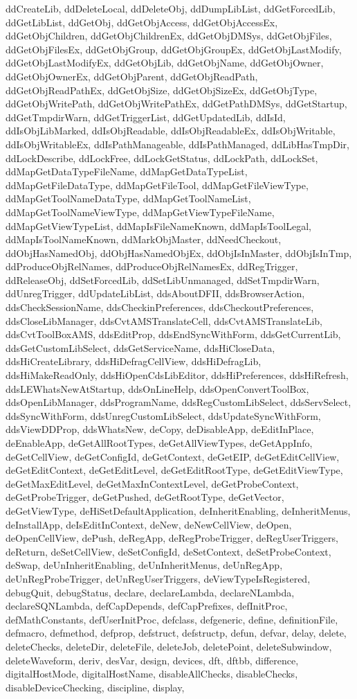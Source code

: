 {{ddCreateLib, ddDeleteLocal, ddDeleteObj, ddDumpLibList, ddGetForcedLib, ddGetLibList, ddGetObj, ddGetObjAccess, ddGetObjAccessEx, ddGetObjChildren, ddGetObjChildrenEx, ddGetObjDMSys, ddGetObjFiles, ddGetObjFilesEx, ddGetObjGroup, ddGetObjGroupEx, ddGetObjLastModify, ddGetObjLastModifyEx, ddGetObjLib, ddGetObjName, ddGetObjOwner, ddGetObjOwnerEx, ddGetObjParent, ddGetObjReadPath, ddGetObjReadPathEx, ddGetObjSize, ddGetObjSizeEx, ddGetObjType, ddGetObjWritePath, ddGetObjWritePathEx, ddGetPathDMSys, ddGetStartup, ddGetTmpdirWarn, ddGetTriggerList, ddGetUpdatedLib, ddIsId, ddIsObjLibMarked, ddIsObjReadable, ddIsObjReadableEx, ddIsObjWritable, ddIsObjWritableEx, ddIsPathManageable, ddIsPathManaged, ddLibHasTmpDir, ddLockDescribe, ddLockFree, ddLockGetStatus, ddLockPath, ddLockSet, ddMapGetDataTypeFileName, ddMapGetDataTypeList, ddMapGetFileDataType, ddMapGetFileTool, ddMapGetFileViewType, ddMapGetToolNameDataType, ddMapGetToolNameList, ddMapGetToolNameViewType, ddMapGetViewTypeFileName, ddMapGetViewTypeList, ddMapIsFileNameKnown, ddMapIsToolLegal, ddMapIsToolNameKnown, ddMarkObjMaster, ddNeedCheckout, ddObjHasNamedObj, ddObjHasNamedObjEx, ddObjIsInMaster, ddObjIsInTmp, ddProduceObjRelNames, ddProduceObjRelNamesEx, ddRegTrigger, ddReleaseObj, ddSetForcedLib, ddSetLibUnmanaged, ddSetTmpdirWarn, ddUnregTrigger, ddUpdateLibList, ddsAboutDFII, ddsBrowserAction, ddsCheckSessionName, ddsCheckinPreferences, ddsCheckoutPreferences, ddsCloseLibManager, ddsCvtAMSTranslateCell, ddsCvtAMSTranslateLib, ddsCvtToolBoxAMS, ddsEditProp, ddsEndSyncWithForm, ddsGetCurrentLib, ddsGetCustomLibSelect, ddsGetServiceName, ddsHiCloseData, ddsHiCreateLibrary, ddsHiDefragCellView, ddsHiDefragLib, ddsHiMakeReadOnly, ddsHiOpenCdsLibEditor, ddsHiPreferences, ddsHiRefresh, ddsLEWhatsNewAtStartup, ddsOnLineHelp, ddsOpenConvertToolBox, ddsOpenLibManager, ddsProgramName, ddsRegCustomLibSelect, ddsServSelect, ddsSyncWithForm, ddsUnregCustomLibSelect, ddsUpdateSyncWithForm, ddsViewDDProp, ddsWhatsNew, deCopy, deDisableApp, deEditInPlace, deEnableApp, deGetAllRootTypes, deGetAllViewTypes, deGetAppInfo, deGetCellView, deGetConfigId, deGetContext, deGetEIP, deGetEditCellView, deGetEditContext, deGetEditLevel, deGetEditRootType, deGetEditViewType, deGetMaxEditLevel, deGetMaxInContextLevel, deGetProbeContext, deGetProbeTrigger, deGetPushed, deGetRootType, deGetVector, deGetViewType, deHiSetDefaultApplication, deInheritEnabling, deInheritMenus, deInstallApp, deIsEditInContext, deNew, deNewCellView, deOpen, deOpenCellView, dePush, deRegApp, deRegProbeTrigger, deRegUserTriggers, deReturn, deSetCellView, deSetConfigId, deSetContext, deSetProbeContext, deSwap, deUnInheritEnabling, deUnInheritMenus, deUnRegApp, deUnRegProbeTrigger, deUnRegUserTriggers, deViewTypeIsRegistered, debugQuit, debugStatus, declare, declareLambda, declareNLambda, declareSQNLambda, defCapDepends, defCapPrefixes, defInitProc, defMathConstants, defUserInitProc, defclass, defgeneric, define, definitionFile, defmacro, defmethod, defprop, defstruct, defstructp, defun, defvar, delay, delete, deleteChecks, deleteDir, deleteFile, deleteJob, deletePoint, deleteSubwindow, deleteWaveform, deriv, desVar, design, devices, dft, dftbb, difference, digitalHostMode, digitalHostName, disableAllChecks, disableChecks, disableDeviceChecking, discipline, display, }}
